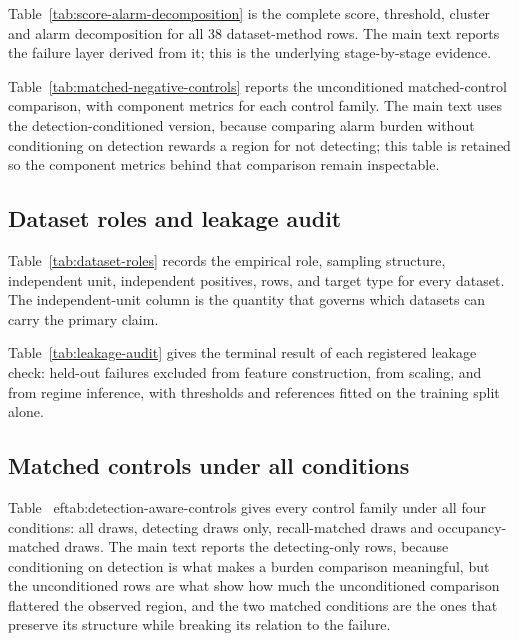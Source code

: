 Table~\ref{tab:score-alarm-decomposition} is the complete score, threshold, cluster and alarm decomposition for all 38 dataset-method rows. The main text reports the failure layer derived from it; this is the underlying stage-by-stage evidence.



Table~\ref{tab:matched-negative-controls} reports the unconditioned matched-control comparison, with component metrics for each control family. The main text uses the detection-conditioned version, because comparing alarm burden without conditioning on detection rewards a region for not detecting; this table is retained so the component metrics behind that comparison remain inspectable.



\subsection{Dataset roles and leakage audit}
\label{supp:roles-leakage}

Table~\ref{tab:dataset-roles} records the empirical role, sampling structure, independent unit, independent positives, rows, and target type for every dataset. The independent-unit column is the quantity that governs which datasets can carry the primary claim.



Table~\ref{tab:leakage-audit} gives the terminal result of each registered leakage check: held-out failures excluded from feature construction, from scaling, and from regime inference, with thresholds and references fitted on the training split alone.



\subsection{Matched controls under all conditions}
\label{supp:all-conditions}

Table~
ef{tab:detection-aware-controls} gives every control family under all four
conditions: all draws, detecting draws only, recall-matched draws and
occupancy-matched draws. The main text reports the detecting-only rows, because
conditioning on detection is what makes a burden comparison meaningful, but the
unconditioned rows are what show how much the unconditioned comparison flattered the
observed region, and the two matched conditions are the ones that preserve its
structure while breaking its relation to the failure.


